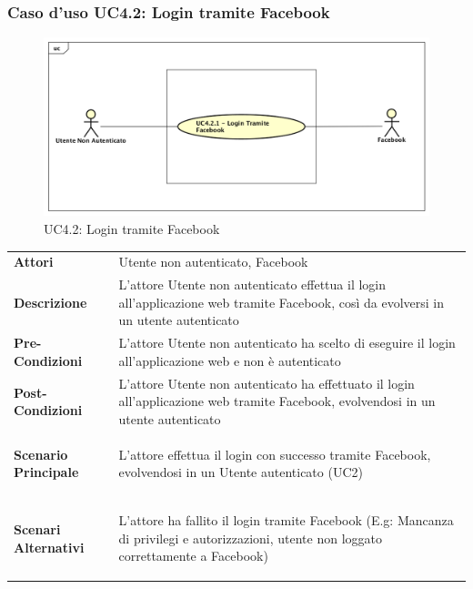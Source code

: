 \newpage
\subsubsection{Caso d'uso UC4.2: Login tramite Facebook }
\label{UC4_2}
\begin{figure}[!htbp]
	\centering
	\includegraphics[scale=0.45]{UML/UC4_2.png}
	\caption{UC4.2: Login tramite Facebook}
\end{figure}

\begin{tabular}{ l | p{11cm}}
	\hline
	\rowcolor{Gray}
	 \multicolumn{2}{c}{UC4.2 - Login tramite Facebook} \\
	 \hline
	\textbf{Attori} & Utente non autenticato, Facebook \\
	\textbf{Descrizione} & L'attore Utente non autenticato effettua il login all'applicazione web tramite Facebook, così da evolversi in un utente autenticato\\
	\textbf{Pre-Condizioni} & L'attore Utente non autenticato ha scelto di eseguire il login all'applicazione web e non è autenticato \\
	\textbf{Post-Condizioni} & L'attore Utente non autenticato ha effettuato il login all'applicazione web tramite Facebook, evolvendosi in un utente autenticato \\
	\textbf{Scenario Principale} & \begin{enumerate*}[label=(\arabic*.),itemjoin={\newline}]
		\item L'attore effettua il login con successo tramite Facebook, evolvendosi in un Utente autenticato (UC2)
	\end{enumerate*}\\
	\textbf{Scenari Alternativi} & \begin{enumerate*}[label=(\arabic*.),itemjoin={\newline}]
	\item L'attore ha fallito il login tramite Facebook (E.g: Mancanza di privilegi e autorizzazioni, utente non loggato correttamente a Facebook)
	\end{enumerate*}\\
\end{tabular}